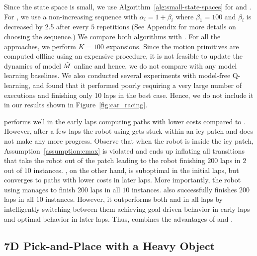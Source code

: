 Since the state space is small, we use
Algorithm~\ref{alg:small-state-spaces} for \cmaxpp{} and
\acmaxpp{}. For \acmaxpp{}, we use a non-increasing sequence with
$\alpha_i = 1 + \beta_i$ where $\beta_1 = 100$ and $\beta_i$ is
decreased by 2.5 after every $5$ repetitions (See Appendix for more details on choosing the sequence.) We
compare both algorithms with \cmax{}. For all the approaches, we
perform $K=100$ expansions. Since
the motion primitives are computed offline using an expensive
procedure, it is not feasible to update the dynamics of model $\hat{M}$
online and hence, we do not compare with any model learning baselines. We
also conducted several experiments with model-free Q-learning, and found that it
performed poorly requiring a very large number of executions and finishing
only 10 laps in the best case. Hence, we do not include it in our
results shown in Figure~\ref{fig:car_racing}.

\cmax{} performs
well in the early laps computing paths with lower costs compared to
\cmaxpp{}. However, after a few laps the robot using \cmax{} gets
stuck within an icy patch and does not make any more progress. Observe
that when the robot is inside the icy patch,
Assumption~\ref{assumption:cmax} is violated and \cmax{} ends up
inflating all transitions that take the robot out of the patch leading
to the robot finishing $200$ laps in $2$ out of $10$
instances. \cmaxpp{}, on the other hand, is suboptimal in the initial
laps, but converges to paths with lower costs in later
laps. More importantly, the robot using \cmaxpp{} manages to finish
$200$ laps in all $10$ instances. \acmaxpp{} also successfully
finishes $200$ laps in all $10$ instances. However, it 
outperforms both \cmax{} and \cmaxpp{} in all laps by intelligently switching between them achieving goal-driven behavior in early laps and optimal behavior in later laps.
Thus, \acmaxpp{} combines the
advantages of \cmax{} and \cmaxpp{}.



\subsection{7D Pick-and-Place with a Heavy Object}
\label{sec:simulated-7d-pick}

